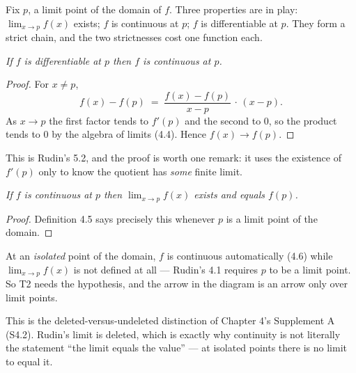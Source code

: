 
\begin{signpost}
Fix $p$, a limit point of the domain of $f$. Three properties are in play:
$\lim_{x\to p}f(x)$ exists; $f$ is continuous at $p$; $f$ is differentiable
at $p$. They form a strict chain, and the two strictnesses cost one function
each.
\end{signpost}

\emph{If $f$ is differentiable at $p$ then $f$ is continuous at $p$.}

\begin{proof}
For $x \ne p$,
\[ f(x)-f(p) \;=\; \frac{f(x)-f(p)}{x-p}\,\cdot\,(x-p) . \]
As $x \to p$ the first factor tends to $f'(p)$ and the second to $0$, so the
product tends to $0$ by the algebra of limits (4.4). Hence
$f(x) \to f(p)$.
\end{proof}

\noindent
This is Rudin's 5.2, and the proof is worth one remark: it uses the existence
of $f'(p)$ only to know the quotient has \emph{some} finite limit.

\emph{If $f$ is continuous at $p$ then $\lim_{x\to p}f(x)$ exists and equals
$f(p)$.}

\begin{proof}
Definition 4.5 says precisely this whenever $p$ is a limit point of the
domain.
\end{proof}

\begin{pitfall}
At an \emph{isolated} point of the domain, $f$ is continuous automatically
(4.6) while $\lim_{x\to p} f(x)$ is not defined at all --- Rudin's 4.1
requires $p$ to be a limit point. So T2 needs the hypothesis, and the arrow
in the diagram is an arrow only over limit points.

This is the deleted-versus-undeleted distinction of Chapter 4's Supplement A
(S4.2). Rudin's limit is deleted, which is exactly why continuity is not
literally the statement ``the limit equals the value'' --- at isolated points
there is no limit to equal it.
\end{pitfall}

